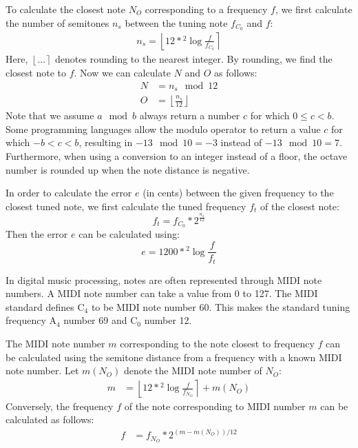 \documentclass[10pt,twocolumn]{article}
\newcommand{\note}[2]{#1${}_{#2}$}
\newcommand{\floor}[1]{\left \lfloor #1 \right \rfloor}
\newcommand{\round}[1]{\left \lfloor #1 \right \rceil}
\begin{document}
To calculate the closest note $N_O$ corresponding to a frequency $f$, we first calculate the number of semitones $n_s$ between the tuning note $f_{C_0}$ and $f$:
\begin{align*}
    n_s = \round{12 * {}^{2}\!\log{\frac{f}{f_{C_0}}}}
\end{align*}
Here, $\round{\ldots}$ denotes rounding to the nearest integer. By rounding, we find the closest note to $f$. Now we can calculate $N$ and $O$ as follows:
\begin{align*}
    N &= n_s \mod 12 \\
    O &= \floor{\frac{n_s}{12}}
\end{align*}
Note that we assume $a \mod b$ always return a number $c$ for which $0 \leq c < b$. Some programming languages allow the modulo operator to return a value $c$ for which $-b < c < b$, resulting in $-13 \mod 10 = -3$ instead of $-13 \mod 10 = 7$. Furthermore, when using a conversion to an integer instead of a floor, the octave number is rounded up when the note distance is negative.

In order to calculate the error $e$ (in cents) between the given frequency to the closest tuned note, we first calculate the tuned frequency $f_t$ of the closest note:
\[ f_t = f_{C_0} * 2^{\frac{n_s}{12}} \]
Then the error $e$ can be calculated using:
\[ e = 1200 * {}^{2}\!\log{\frac{f}{f_t}} \]

In digital music processing, notes are often represented through MIDI note numbers. A MIDI note number can take a value from 0 to 127. The MIDI standard defines \note{C}{4} to be MIDI note number 60. This makes the standard tuning frequency \note{A}{4} number 69 and \note{C}{0} number 12.

The MIDI note number $m$ corresponding to the note closest to frequency $f$ can be calculated using the semitone distance from a frequency with a known MIDI note number. Let $m(N_O)$ denote the MIDI note number of $N_O$:
\begin{align*}
    m &= \round{12 * {}^{2}\!\log{\frac{f}{f_{N_O}}}} + m(N_O)%
\end{align*}
Conversely, the frequency $f$ of the note corresponding to MIDI number $m$ can be calculated as follows:
\begin{align*}
    f &= f_{N_O} * 2^{(m - m(N_O)) / 12}%
\end{align*}
\end{document}
